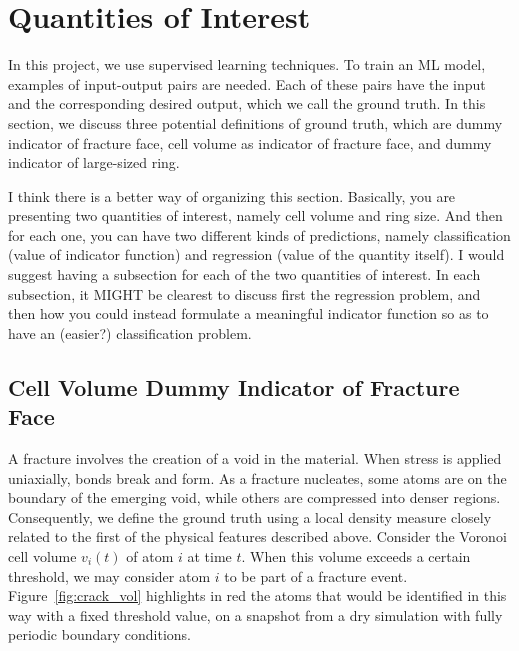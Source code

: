 \section{Quantities of Interest}

In this project, we use supervised learning techniques. To train an ML model, examples of input-output pairs are needed. Each of these pairs have the input and the corresponding desired output, which we call the ground truth. In this section, we discuss three potential definitions of ground truth, which are dummy indicator of fracture face, cell volume as indicator of fracture face, and dummy indicator of large-sized ring.

{\color{red}I think there is a better way of organizing this section.  Basically, you are presenting two quantities of interest, namely cell volume and ring size.  And then for each one, you can have two different kinds of predictions, namely classification (value of indicator function) and regression (value of the quantity itself).  I would suggest having a subsection for each of the two quantities of interest.  In each subsection, it MIGHT be clearest to discuss first the regression problem, and then how you could instead formulate a meaningful indicator function so as to have an (easier?) classification problem.}

\subsection{Cell Volume Dummy Indicator of Fracture Face}

A fracture involves the creation of a void in the material. When stress is applied uniaxially, bonds break and form.  As a fracture nucleates, some atoms are on the boundary of the emerging void, while others are compressed into denser regions. Consequently, we define the ground truth using a local density measure closely related to the first of the physical features described above.  Consider the Voronoi cell volume $v_i(t)$ of atom $i$ at time $t$.  When this volume exceeds a certain threshold, we may consider atom $i$ to be part of a fracture event.  Figure~\ref{fig:crack_vol} highlights in red the atoms that would be identified in this way with a fixed threshold value, on a snapshot from a dry simulation with fully periodic boundary conditions.

